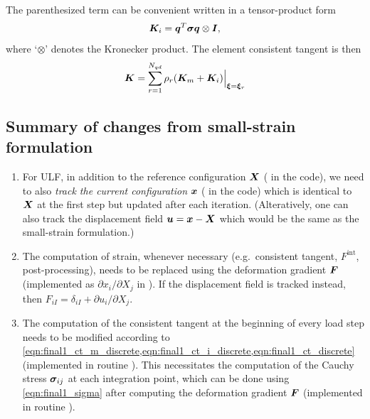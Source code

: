 The parenthesized term can be convenient written in a tensor-product form \begin{equation}\label{eqn:final1_ct_i_discrete}
    \bm{K}_i = \bm{q}^T \bm{\sigma} \bm{q} \otimes \bm{I},
\end{equation} 
where `$\otimes$' denotes the Kronecker product. 
The element consistent tangent is then 
\begin{equation}\label{eqn:final1_ct_discrete}
    \bm{K} = \sum_{r=1}^{N_{qd}} \rho_r (\bm{K}_m + \bm{K}_i)\Big|_{\bm{\xi}=\bm{\xi}_r}
\end{equation}

\subsection{Summary of changes from small-strain formulation}
\begin{enumerate}[1.]
\item {
    For ULF, in addition to the reference configuration $\bm{X}$ ( in the code), we need to also \emph{track the current configuration} $\bm{x}$ ( in the code) which is identical to $\bm{X}$ at the first step but updated after each iteration. 
    (Alteratively, one can also track the displacement field $\bm{u} = \bm{x} - \bm{X}$ which would be the same as the small-strain formulation.)
}
\item {
    The computation of strain, whenever necessary (e.g.~consistent tangent, $F^{\textrm{int}}$, post-processing), needs to be replaced using the deformation gradient $\bm{F}$ (implemented as $\partial x_i / \partial X_j$ in \href{https://github.com/sy-cui/CSE552-FA2024/blob/main/final/part1/elasticity/hyperelasticity/def_grad_2d.m}{}).
    If the displacement field is tracked instead, then $F_{iI} = \delta_{iI} + \partial u_i / \partial X_j$.
}
\item {
    The computation of the consistent tangent at the beginning of every load step needs to be modified according to \cref{eqn:final1_ct_m_discrete,eqn:final1_ct_i_discrete,eqn:final1_ct_discrete} (implemented in routine \href{https://github.com/sy-cui/CSE552-FA2024/blob/main/final/part1/elasticity/hyperelasticity/L_Elem2_NH.m}{}). 
    This necessitates the computation of the Cauchy stress $\bm{\sigma}_{ij}$ at each integration point, which can be done using \cref{eqn:final1_sigma} after computing the deformation gradient $\bm{F}$ (implemented in routine \href{https://github.com/sy-cui/CSE552-FA2024/blob/main/final/part1/elasticity/hyperelasticity/cauchy.m}{}). 
}
\end{enumerate}
